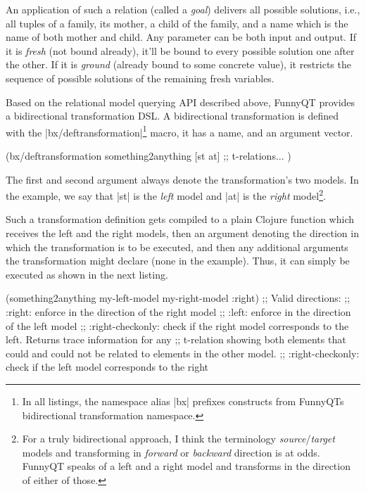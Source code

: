 \documentclass[a4paper]{article}
\newcommand{\code}{\clojureinline}
\begin{document}
An application of such a relation (called a \emph{goal}) delivers all possible
solutions, i.e., all tuples of a family, its mother, a child of the family, and
a name which is the name of both mother and child.  Any parameter can be both
input and output.  If it is \emph{fresh} (not bound already), it'll be bound to
every possible solution one after the other.  If it is \emph{ground} (already
bound to some concrete value), it restricts the sequence of possible solutions
of the remaining fresh variables.

\bigskip{}

Based on the relational model querying API described above, FunnyQT provides a
bidirectional transformation DSL.  A bidirectional transformation is defined
with the \code|bx/deftransformation|\footnote{In all listings, the namespace
  alias \code|bx| prefixes constructs from FunnyQTs bidirectional
  transformation namespace.} macro, it has a name, and an argument vector.

\begin{clojurecode}
(bx/deftransformation something2anything [st at]
  ;; t-relations...
  )
\end{clojurecode}

The first and second argument always denote the transformation's two models.
In the example, we say that \code|st| is the \emph{left} model and \code|at| is
the \emph{right} model\footnote{For a truly bidirectional approach, I think the
  terminology \emph{source}/\emph{target} models and transforming in
  \emph{forward} or \emph{backward} direction is at odds.  FunnyQT speaks of a
  left and a right model and transforms in the direction of either of those.}.

Such a transformation definition gets compiled to a plain Clojure function
which receives the left and the right models, then an argument denoting the
direction in which the transformation is to be executed, and then any
additional arguments the transformation might declare (none in the example).
Thus, it can simply be executed as shown in the next listing.

\begin{clojurecode}
(something2anything my-left-model my-right-model :right)
;; Valid directions:
;; :right: enforce in the direction of the right model
;; :left:  enforce in the direction of the left model
;; :right-checkonly: check if the right model corresponds to the left. Returns trace information for any
;;   t-relation showing both elements that could and could not be related to elements in the other model.
;; :right-checkonly: check if the left model corresponds to the right
\end{clojurecode}
\end{document}
